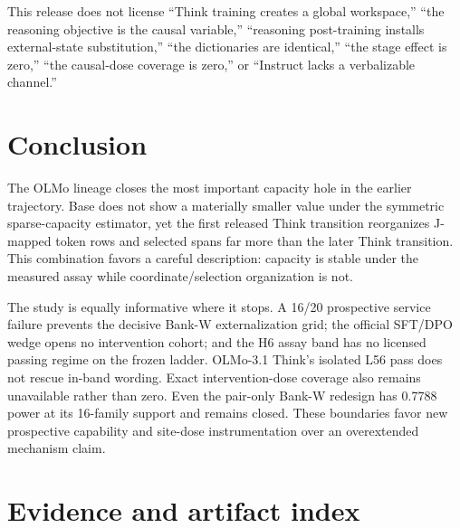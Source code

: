 \documentclass[11pt]{article}
\begin{document}
\begin{warningbox}[title={Prohibited conclusions}]
This release does not license ``Think training creates a global workspace,''
``the reasoning objective is the causal variable,'' ``reasoning post-training
installs external-state substitution,'' ``the dictionaries are identical,''
``the stage effect is zero,'' ``the causal-dose coverage is zero,'' or
``Instruct lacks a verbalizable channel.''
\end{warningbox}

\section{Conclusion}

The OLMo lineage closes the most important capacity hole in the earlier
trajectory. Base does not show a materially smaller value under the symmetric
sparse-capacity estimator, yet the first released Think transition reorganizes
J-mapped token rows and selected spans far more than the later Think transition.
This combination favors a careful description: capacity is stable under the
measured assay while coordinate/selection organization is not.

The study is equally informative where it stops. A 16/20 prospective service
failure prevents the decisive Bank-W externalization grid; the official
SFT/DPO wedge opens no intervention cohort; and the H6 assay band has no
licensed passing regime on the frozen ladder. OLMo-3.1 Think's isolated L56
pass does not rescue in-band wording. Exact intervention-dose coverage also
remains unavailable rather than zero. Even the pair-only Bank-W redesign has
0.7788 power at its 16-family support and remains closed. These boundaries
favor new prospective capability and site-dose instrumentation over an
overextended mechanism claim.

\appendix
\section{Evidence and artifact index}
\end{document}
